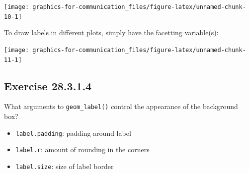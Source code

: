 \documentclass[]{book}
\newenvironment{Shaded}{\begin{snugshade}}{\end{snugshade}}
\newcommand{\DataTypeTok}[1]{\textcolor[rgb]{0.13,0.29,0.53}{#1}}
\newcommand{\DecValTok}[1]{\textcolor[rgb]{0.00,0.00,0.81}{#1}}
\newcommand{\KeywordTok}[1]{\textcolor[rgb]{0.13,0.29,0.53}{\textbf{#1}}}
\newcommand{\NormalTok}[1]{#1}
\newcommand{\OperatorTok}[1]{\textcolor[rgb]{0.81,0.36,0.00}{\textbf{#1}}}
\newcommand{\OtherTok}[1]{\textcolor[rgb]{0.56,0.35,0.01}{#1}}
\newcommand{\StringTok}[1]{\textcolor[rgb]{0.31,0.60,0.02}{#1}}
\providecommand{\tightlist}{%
  \setlength{\itemsep}{0pt}\setlength{\parskip}{0pt}}
\theoremstyle{plain}
\theoremstyle{remark}
\begin{document}
\begin{center}\texttt{[image: graphics-for-communication\_files/figure-latex/unnamed-chunk-10-1]} \end{center}

To draw labels in different plots, simply have the facetting variable(s):

\begin{Shaded}
\end{Shaded}

\begin{center}\texttt{[image: graphics-for-communication\_files/figure-latex/unnamed-chunk-11-1]} \end{center}

\hypertarget{exercise-28.3.1.4}{%
\subsection*{\texorpdfstring{Exercise {28.3.1.4}}{Exercise 28.3.1.4}}\label{exercise-28.3.1.4}}

What arguments to \texttt{geom\_label()} control the appearance of the background box?

\begin{itemize}
\tightlist
\item
  \texttt{label.padding}: padding around label
\item
  \texttt{label.r}: amount of rounding in the corners
\item
  \texttt{label.size}: size of label border
\end{itemize}
\end{document}
